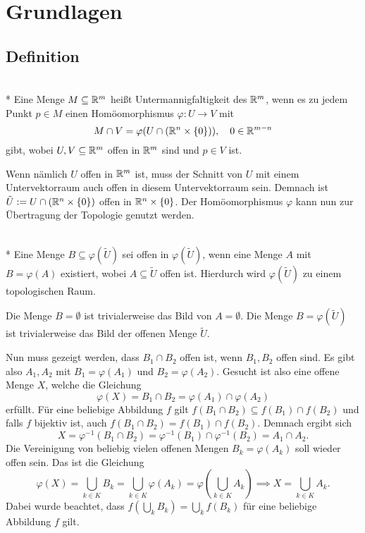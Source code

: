 \section{Grundlagen}
\subsection{Definition}

\begin{definition}%
\mbox{}\\*
Eine Menge $M\subseteq\mathbb R^m$ heißt
Untermannigfaltigkeit des $\mathbb R^m$, wenn es zu jedem Punkt $p\in M$ einen
Homöomorphismus $\varphi\colon U\to V$ mit%
\begin{equation}
M\cap V = \varphi(U\cap(\mathbb R^n\times\{0\})),\quad 0\in\mathbb R^{m-n}
\end{equation}
gibt, wobei $U,V\subseteq\mathbb R^m$ offen in $\mathbb R^m$ sind und $p\in V$ ist.
\end{definition}
Wenn nämlich $U$ offen in $\mathbb R^m$ ist, muss der Schnitt von $U$
mit einem Untervektorraum auch offen in diesem Untervektorraum
sein. Demnach ist $\tilde U:=U\cap(\mathbb R^n\times\{0\})$ offen in
$\mathbb R^n\times\{0\}$. Der Homöomorphismus $\varphi$ kann nun zur
Übertragung der Topologie genutzt werden. 

\begin{theorem}\mbox{}\\*
Eine Menge $B\subseteq\varphi(\tilde U)$
sei offen in $\varphi(\tilde U)$, wenn eine Menge $A$ mit
$B=\varphi(A)$ existiert, wobei
$A\subseteq\tilde U$ offen ist.
Hierdurch wird $\varphi(\tilde U)$
zu einem topologischen Raum.
\end{theorem}

\noindent{}
Die Menge $B=\emptyset$ ist trivialerweise das Bild von
$A=\emptyset$. Die Menge $B=\varphi(\tilde U)$ ist
trivialerweise das Bild der offenen Menge $\tilde U$.

Nun muss gezeigt werden, dass $B_1\cap B_2$ offen ist,
wenn $B_1,B_2$ offen sind. Es gibt also $A_1,A_2$ mit $B_1=\varphi(A_1)$
und $B_2=\varphi(A_2)$. Gesucht ist also eine offene Menge $X$,
welche die Gleichung
\begin{equation}
\varphi(X) = B_1\cap B_2 = \varphi(A_1)\cap\varphi(A_2)
\end{equation}
erfüllt. Für eine beliebige Abbildung $f$ gilt
$f(B_1\cap B_2) \subseteq f(B_1)\cap f(B_2)$ und falls $f$
bijektiv ist, auch $f(B_1\cap B_2)=f(B_1)\cap f(B_2)$. Demnach
ergibt sich
\begin{equation}
X = \varphi^{-1}(B_1\cap B_2) = \varphi^{-1}(B_1)\cap\varphi^{-1}(B_2)
= A_1\cap A_2.
\end{equation}
Die Vereinigung von beliebig vielen offenen Mengen $B_k=\varphi(A_k)$
soll wieder offen sein. Das ist die Gleichung
\begin{equation}
\varphi(X) = \bigcup_{k\in K} B_k = \bigcup_{k\in K} \varphi(A_k)
= \varphi(\bigcup_{k\in K} A_k)
\implies X=\bigcup_{k\in K} A_k.
\end{equation}
Dabei wurde beachtet, dass $f(\bigcup_k B_k) = \bigcup_k f(B_k)$
für eine beliebige Abbildung $f$ gilt.\;\qedsymbol

